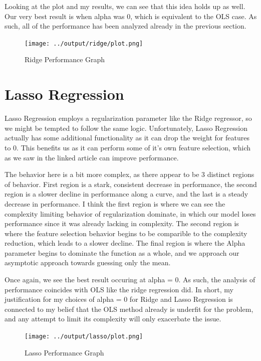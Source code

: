 \documentclass[12pt]{article}
\begin{document}
Looking at the plot and my results, we can see that this idea holds up as well. Our very best result is when alpha was
0, which is equivalent to the OLS case. As such, all of the performance has been analyzed already in the previous section.

\begin{figure}
  \texttt{[image: ../output/ridge/plot.png]}
  \caption{Ridge Performance Graph}
\end{figure}



\section{Lasso Regression}
Lasso Regression employs a regularization parameter like the Ridge regressor, so we might be tempted to follow the same logic.
Unfortunately, Lasso Regression actually has some additional functionality as it can drop the weight for features to 0.
This benefits us as it can perform some of it's own feature selection, which as we saw in the linked article can improve 
performance. 

The behavior here is a bit more complex, as there appear to be 3 distinct regions of behavior. First region is a stark, consistent
decrease in performance, the second region is a slower decline in performance along a curve, and the last is a steady decrease in performance.
I think the first region is where we can see the complexity limiting behavior of regularization dominate, in which our model 
loses performance since it was already lacking in complexity. The second region is where the feature selection behavior 
begins to be comparible to the complexity reduction, which leads to a slower decline. The final region is where the Alpha 
parameter begins to dominate the function as a whole, and we approach our asymptotic approach towards guessing only the mean.

Once again, we see the best result occuring at alpha = 0. As such, the analysis of performance coincides with OLS like the 
ridge regression did. In short, my justification for my choices of alpha = 0 for Ridge and Lasso Regression is connected to 
my belief that the OLS method already is underfit for the problem, and any attempt to limit its complexity will only 
exacerbate the issue.

\begin{figure}
  \texttt{[image: ../output/lasso/plot.png]}
  \caption{Lasso Performance Graph}
\end{figure}
\end{document}
